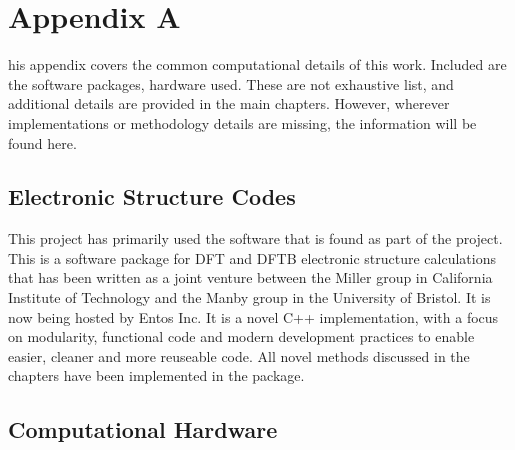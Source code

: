 %
%

\chapter{Appendix A}
\label{app:app01}

his appendix covers the common computational details of this work.
Included are the software packages, hardware used. These are not 
exhaustive list, and additional details are provided in the main chapters. However,
wherever implementations or methodology details are missing, the information will
be found here.

\section{Electronic Structure Codes}
This project has primarily used the  software that is found as part
of the  project. This is a software package for DFT and DFTB electronic
structure calculations that has been written as a joint venture between the Miller
group in California Institute of Technology and the Manby group in the 
University of Bristol. It is now being hosted by Entos Inc. It is a novel C++
implementation, with a focus on modularity, functional code and modern development
practices to enable easier, cleaner and more reuseable code.
All novel methods discussed in the chapters have been implemented in the  
package.



\section{Computational Hardware}







\